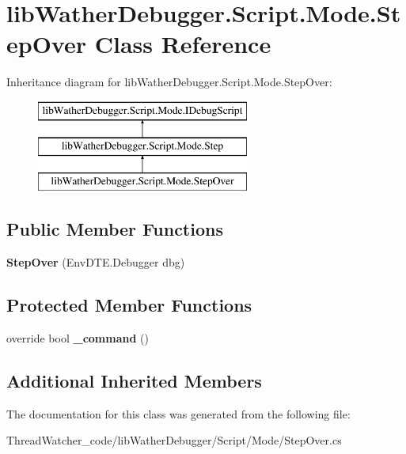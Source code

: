 \hypertarget{classlib_wather_debugger_1_1_script_1_1_mode_1_1_step_over}{\section{lib\+Wather\+Debugger.\+Script.\+Mode.\+Step\+Over Class Reference}
\label{classlib_wather_debugger_1_1_script_1_1_mode_1_1_step_over}
}
Inheritance diagram for lib\+Wather\+Debugger.\+Script.\+Mode.\+Step\+Over\+:\begin{figure}[H]
\begin{center}
\leavevmode
\includegraphics[height=3.000000cm]{classlib_wather_debugger_1_1_script_1_1_mode_1_1_step_over}
\end{center}
\end{figure}
\subsection*{Public Member Functions}
\begin{DoxyCompactItemize}
\item 
\hypertarget{classlib_wather_debugger_1_1_script_1_1_mode_1_1_step_over_a5b416bbb8be2e5e788fe4eb534b5eda4}{{\bfseries Step\+Over} (Env\+D\+T\+E.\+Debugger dbg)}\label{classlib_wather_debugger_1_1_script_1_1_mode_1_1_step_over_a5b416bbb8be2e5e788fe4eb534b5eda4}

\end{DoxyCompactItemize}
\subsection*{Protected Member Functions}
\begin{DoxyCompactItemize}
\item 
\hypertarget{classlib_wather_debugger_1_1_script_1_1_mode_1_1_step_over_a384928fb42eedd0f837ee4886d2227d2}{override bool {\bfseries \+\_\+command} ()}\label{classlib_wather_debugger_1_1_script_1_1_mode_1_1_step_over_a384928fb42eedd0f837ee4886d2227d2}

\end{DoxyCompactItemize}
\subsection*{Additional Inherited Members}


The documentation for this class was generated from the following file\+:\begin{DoxyCompactItemize}
\item 
Thread\+Watcher\+\_\+code/lib\+Wather\+Debugger/\+Script/\+Mode/Step\+Over.\+cs\end{DoxyCompactItemize}
